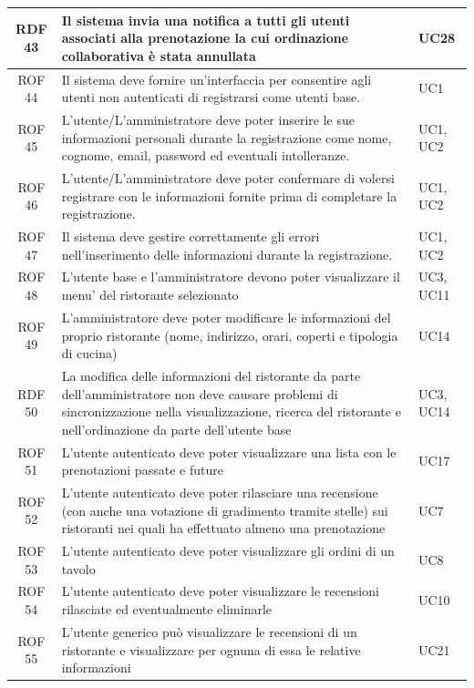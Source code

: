 \documentclass[12pt, oneside]{article}
\begin{document}
\begin{longtable}{|c|p{14cm}|p{2cm}|}
    \hline
    RDF 43 & Il sistema invia una notifica a tutti gli utenti associati alla prenotazione la cui ordinazione collaborativa è stata annullata & UC28 \\
    \hline
    ROF 44 & Il sistema deve fornire un'interfaccia per consentire agli utenti non autenticati di registrarsi come utenti base. & UC1 \\
    \hline
    ROF 45 & L'utente/L'amministratore deve poter inserire le sue informazioni personali durante la registrazione come nome, cognome, email, password ed eventuali intolleranze. & UC1, UC2 \\
    \hline
    ROF 46 & L'utente/L'amministratore deve poter confermare di volersi registrare con le informazioni fornite prima di completare la registrazione. & UC1, UC2 \\
    \hline
    ROF 47 & Il sistema deve gestire correttamente gli errori nell'inserimento delle informazioni durante la registrazione. & UC1, UC2 \\
    \hline 
    ROF 48 & L'utente base e l'amministratore devono poter visualizzare il menu' del ristorante selezionato & UC3, UC11\\
    \hline
    ROF 49 & L'amministratore deve poter modificare le informazioni del proprio ristorante (nome, indirizzo, orari, coperti e tipologia di cucina) & UC14\\
    \hline
    RDF 50 & La modifica delle informazioni del ristorante da parte dell'amministratore non deve causare problemi di sincronizzazione nella visualizzazione, ricerca del ristorante e nell'ordinazione da parte dell'utente base & UC3, UC14 \\
    \hline
    ROF 51 & L'utente autenticato deve poter visualizzare una lista con le prenotazioni passate e future & UC17 \\
    \hline
    ROF 52 & L'utente autenticato deve poter rilasciare una recensione (con anche una votazione di gradimento tramite stelle) sui ristoranti nei quali ha effettuato almeno una prenotazione & UC7 \\
    \hline
    ROF 53 & L'utente autenticato deve poter visualizzare gli ordini di un tavolo & UC8 \\
    \hline
    ROF 54 & L'utente autenticato deve poter visualizzare le recensioni rilasciate ed eventualmente eliminarle & UC10 \\
    \hline
    ROF 55 & L'utente generico può visualizzare le recensioni di un ristorante e visualizzare per ognuna di essa le relative informazioni & UC21 \\

\end{longtable}
\end{document}
